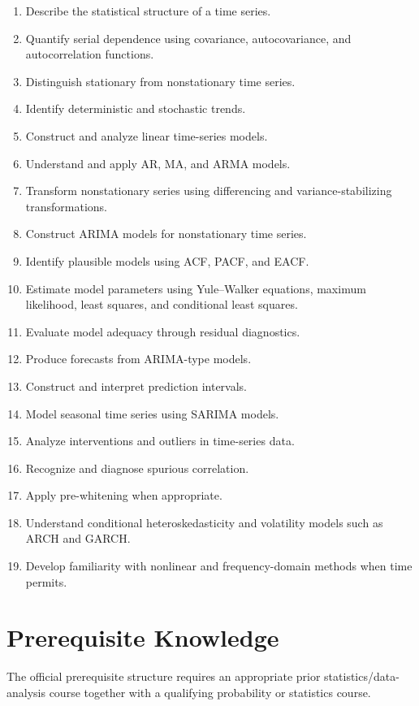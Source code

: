 \documentclass[11pt]{article}
\begin{document}
\begin{enumerate}
    \item Describe the statistical structure of a time series.
    \item Quantify serial dependence using covariance, autocovariance,
          and autocorrelation functions.
    \item Distinguish stationary from nonstationary time series.
    \item Identify deterministic and stochastic trends.
    \item Construct and analyze linear time-series models.
    \item Understand and apply AR, MA, and ARMA models.
    \item Transform nonstationary series using differencing and
          variance-stabilizing transformations.
    \item Construct ARIMA models for nonstationary time series.
    \item Identify plausible models using ACF, PACF, and EACF.
    \item Estimate model parameters using Yule--Walker equations,
          maximum likelihood, least squares, and conditional
          least squares.
    \item Evaluate model adequacy through residual diagnostics.
    \item Produce forecasts from ARIMA-type models.
    \item Construct and interpret prediction intervals.
    \item Model seasonal time series using SARIMA models.
    \item Analyze interventions and outliers in time-series data.
    \item Recognize and diagnose spurious correlation.
    \item Apply pre-whitening when appropriate.
    \item Understand conditional heteroskedasticity and volatility
          models such as ARCH and GARCH.
    \item Develop familiarity with nonlinear and frequency-domain
          methods when time permits.
\end{enumerate}

\section{Prerequisite Knowledge}

The official prerequisite structure requires an appropriate prior
statistics/data-analysis course together with a qualifying probability
or statistics course.
\end{document}
